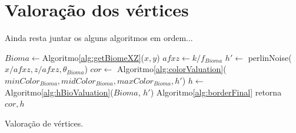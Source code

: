\section{Valoração dos vértices}

Ainda resta juntar os alguns algoritmos em ordem...

\begin{algorithm}[H]\label{alg:vertexValuationm}%
    $Bioma \leftarrow $Algoritmo\ref{alg:getBiomeXZ}($x, y$)\;
    $afxz \leftarrow k/f_{Bioma}$\;
    $h' \leftarrow$ perlinNoise($x/afxz, z/afxz, \theta_{Bioma}$)\;
    $cor \leftarrow$ Algoritmo\ref{alg:colorValuation}($minColor_{Bioma}, midColor_{Bioma}, maxColor_{Bioma}, h'$)\;
    $h \leftarrow$ Algoritmo\ref{alg:hBioValuation}($Bioma$, $h'$)\;
    Algoritmo\ref{alg:borderFinal}\;
    retorna $cor, h$\;
    \caption{Valoração de vértices.}
\end{algorithm}
